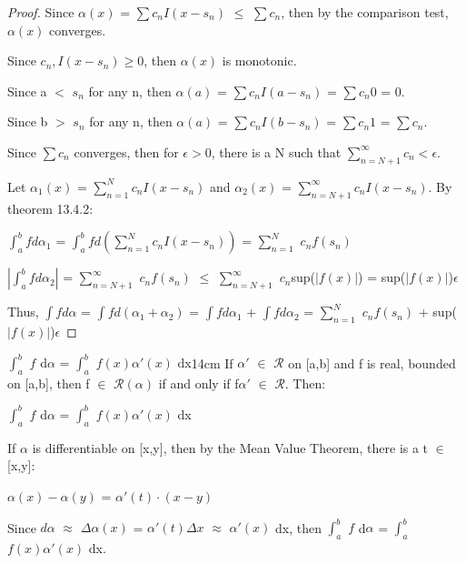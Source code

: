     \begin{proof}
        Since $\alpha(x)$ = $\sum c_n I(x-s_n)$ $\leq$ $\sum c_n$, then
        by the comparison test, $\alpha(x)$ converges.

        Since $c_n,I(x-s_n) \geq 0$, then $\alpha(x)$ is monotonic.

        Since a $<$ $s_n$ for any n, then
        $\alpha(a)$ = $\sum c_n I(a-s_n)$ = $\sum c_n 0$ = 0.

        Since b $>$ $s_n$ for any n, then
        $\alpha(a)$ = $\sum c_n I(b-s_n)$ = $\sum c_n 1$ = $\sum c_n$.

        Since $\sum c_n$ converges, then for $\epsilon > 0$, there is a N
        such that $\sum_{n=N+1}^{\infty} c_n < \epsilon$.

        Let $\alpha_1(x)$ = $\sum_{n=1}^N c_n I(x-s_n)$
        and $\alpha_2(x)$ = $\sum_{n=N+1}^{\infty} c_n I(x-s_n)$.
        By {\color{red} theorem 13.4.2}:
        
        \hspace{0.5cm}
        $\int_a^b f d\alpha_1$
        = $\int_a^b f d(\sum_{n=1}^N c_n I(x-s_n))$
        = $\sum_{n=1}^N$ $c_n f(s_n)$

        \hspace{0.5cm}
        $|\int_a^b f d\alpha_2|$
        = $\sum_{n=N+1}^{\infty}$ $c_n f(s_n)$
        $\leq$ $\sum_{n=N+1}^{\infty}$ $c_n$sup($|f(x)|$)
        = sup($|f(x)|$)$\epsilon$

        Thus, $\int f d\alpha$
        = $\int f d(\alpha_1+\alpha_2)$
        = $\int f d\alpha_1$ + $\int f d\alpha_2$
        = $\sum_{n=1}^N$ $c_n f(s_n)$ + sup($|f(x)|$)$\epsilon$    
    \end{proof}

    \vspace{0.5cm}



    \begin{wtheorem}{$\int_a^b$ $f$ d$\alpha$ = $\int_a^b$ $f(x) \alpha'(x)$ dx}{14cm}
        If $\alpha'$ $\in$ $\mathscr{R}$ on [a,b] and
        f is real, bounded on [a,b], then f $\in$ $\mathscr{R}(\alpha)$
        if and only if f$\alpha'$ $\in$ $\mathscr{R}$. Then:

        \hspace{0.5cm}
        $\int_a^b$ $f$ d$\alpha$ = $\int_a^b$ $f(x) \alpha'(x)$ dx        
    \end{wtheorem}

    \begin{intuition}
        If $\alpha$ is differentiable on [x,y], then by the Mean Value Theorem,
        there is a t $\in$ [x,y]:

        \hspace{0.5cm}
        $\alpha(x) - \alpha(y)$ = $\alpha'(t) \cdot (x-y)$

        Since
        $d\alpha$
        $\approx$ $\Delta \alpha(x)$
        = $\alpha'(t) \Delta x$
        $\approx$ $\alpha'(x)$ dx,
        then $\int_a^b$ $f$ d$\alpha$ = $\int_a^b$ $f(x) \alpha'(x)$ dx.
    \end{intuition}

